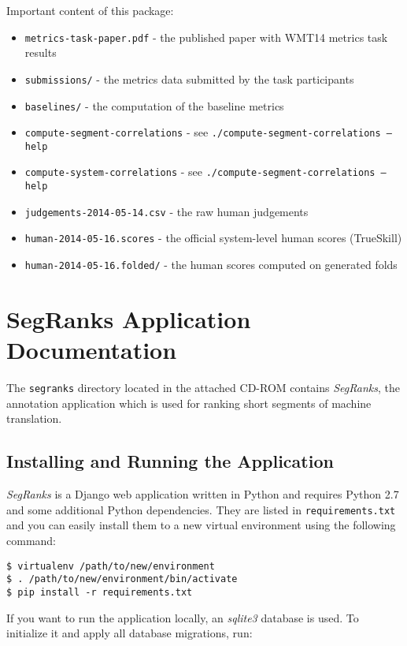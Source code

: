 \noindent Important content of this package:
\begin{itemize}
  \item \texttt{metrics-task-paper.pdf} - the published paper with WMT14 metrics task results
  \item \texttt{submissions/} - the metrics data submitted by the task participants
  \item \texttt{baselines/} - the computation of the baseline metrics
  \item \texttt{compute-segment-correlations} - see \texttt{./compute-segment-correlations --help}
  \item \texttt{compute-system-correlations} - see \texttt{./compute-segment-correlations --help}
  \item \texttt{judgements-2014-05-14.csv} - the raw human judgements
  \item \texttt{human-2014-05-16.scores} - the official system-level human scores (TrueSkill)
  \item \texttt{human-2014-05-16.folded/} - the human scores computed on generated folds
\end{itemize}


\chapter{SegRanks Application Documentation}

The \texttt{segranks} directory located in the attached CD-ROM contains
\textit{SegRanks}, the annotation application which is used for ranking short
segments of machine translation.

\section{Installing and Running the Application}

\textit{SegRanks} is a Django web application written in Python and requires
Python 2.7 and some additional Python dependencies.  They are listed in
\texttt{requirements.txt} and you can easily install them to a new virtual
environment using the following command:

\begin{verbatim}
$ virtualenv /path/to/new/environment
$ . /path/to/new/environment/bin/activate
$ pip install -r requirements.txt
\end{verbatim}

\noindent
If you want to run the application locally, an \textit{sqlite3} database is
used. To initialize it and apply all database migrations, run:

